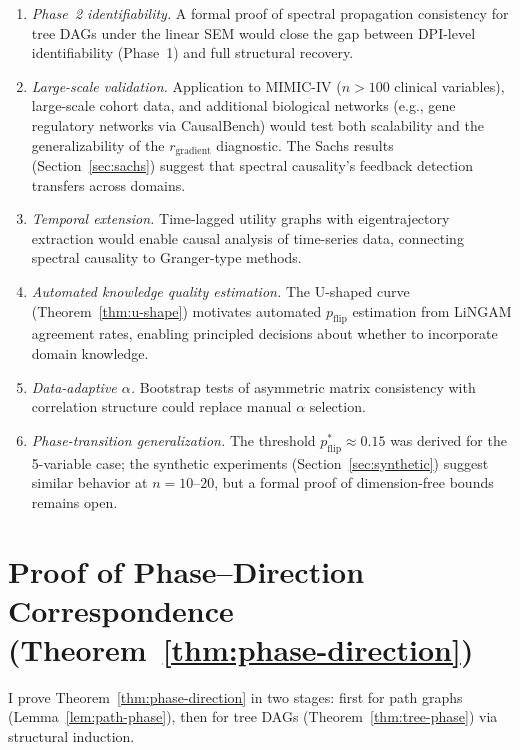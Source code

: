 \documentclass[twoside,11pt]{article}
\begin{document}
\begin{enumerate}
\item \emph{Phase~2 identifiability.}  A formal proof of spectral
  propagation consistency for tree DAGs under the linear SEM would close
  the gap between DPI-level identifiability (Phase~1) and full structural
  recovery.
\item \emph{Large-scale validation.}  Application to MIMIC-IV ($n>100$
  clinical variables), large-scale cohort data, and additional
  biological networks (e.g., gene regulatory networks via CausalBench)
  would test both scalability and the generalizability of the
  $r_{\mathrm{gradient}}$ diagnostic.  The Sachs results
  (Section~\ref{sec:sachs}) suggest that spectral causality's feedback
  detection transfers across domains.
\item \emph{Temporal extension.}  Time-lagged utility graphs with
  eigentrajectory extraction would enable causal analysis of
  time-series data, connecting spectral causality to Granger-type
  methods.
\item \emph{Automated knowledge quality estimation.}  The U-shaped curve
  (Theorem~\ref{thm:u-shape}) motivates automated $p_{\mathrm{flip}}$
  estimation from LiNGAM agreement rates, enabling principled decisions
  about whether to incorporate domain knowledge.
\item \emph{Data-adaptive $\alpha$.}  Bootstrap tests of asymmetric matrix
  consistency with correlation structure could replace manual $\alpha$
  selection.
\item \emph{Phase-transition generalization.}  The threshold
  $p_{\mathrm{flip}}^*\approx 0.15$ was derived for the 5-variable
  case; the synthetic experiments (Section~\ref{sec:synthetic}) suggest
  similar behavior at $n=10$--$20$, but a formal proof of
  dimension-free bounds remains open.
\end{enumerate}


\appendix
\section{Proof of Phase--Direction Correspondence (Theorem~\ref{thm:phase-direction})}
\label{app:phase-proof}

I prove Theorem~\ref{thm:phase-direction} in two stages: first for
path graphs (Lemma~\ref{lem:path-phase}), then for tree DAGs
(Theorem~\ref{thm:tree-phase}) via structural induction.
\end{document}
